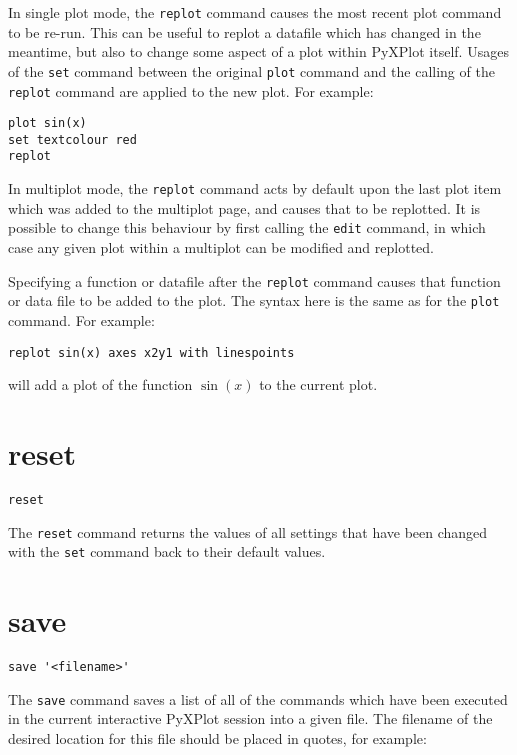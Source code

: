 \documentclass[a4paper,onecolumn,11pt]{book}
\begin{document}
In single plot mode, the {\tt replot} command causes the most recent plot
command to be re-run.  This can be useful to replot a datafile which has changed
in the meantime, but also to change some aspect of a plot within PyXPlot itself.
Usages of the {\tt set} command between the original {\tt plot} command and the
calling of the {\tt replot} command are applied to the new plot. For example:

\begin{verbatim}
plot sin(x)
set textcolour red
replot
\end{verbatim}

In multiplot mode, the {\tt replot} command acts by default upon the last plot
item which was added to the multiplot page, and causes that to be replotted. It
is possible to change this behaviour by first calling the {\tt edit} command, in
which case any given plot within a multiplot can be modified and replotted.

Specifying a function or datafile after the {\tt replot} command causes that
function or data file to be added to the plot. The syntax here is the same as
for the {\tt plot} command.  For example:

\begin{verbatim}
replot sin(x) axes x2y1 with linespoints
\end{verbatim}

\noindent will add a plot of the function $\sin(x)$ to the current plot.

\section{reset}

\begin{verbatim}
reset
\end{verbatim}

The {\tt reset} command returns the values of all settings that have been
changed with the {\tt set} command back to their default values.


\section{save}

\begin{verbatim}
save '<filename>'
\end{verbatim}

The {\tt save} command saves a list of all of the commands which have been
executed in the current interactive PyXPlot session into a given file. The
filename of the desired location for this file should be placed in quotes, for
example:
\end{document}
